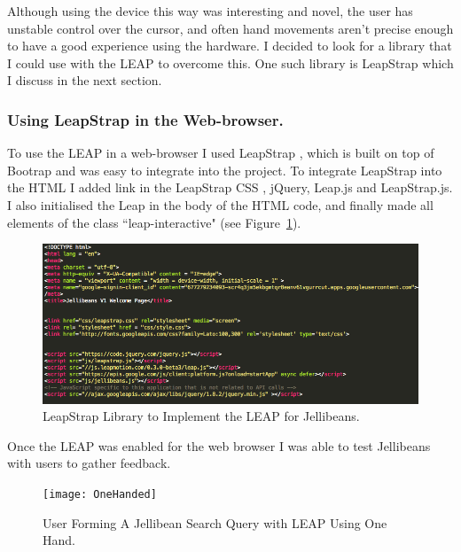 \documentclass[a4paper, 11pt]{article}
\begin{document}
Although using the device this way was interesting and novel, the user has unstable control over the cursor, and often hand movements aren't precise enough to have a good experience using the hardware. I decided to look for a library that I could use with the LEAP to overcome this. One such library is LeapStrap which I discuss in the next section.


\subsubsection{Using LeapStrap in the Web-browser.}
To use the LEAP in a web-browser I used LeapStrap \cite{leapstrap}, which is built on top of Bootrap and was easy to integrate into the project. To integrate LeapStrap into the HTML I added link in the LeapStrap CSS , jQuery, Leap.js and LeapStrap.js. I also initialised the Leap in the body of the HTML code, and finally made all elements of the class ``leap-interactive" (see Figure~\ref{leapstrap}). 

\begin{figure}[H]
\begin{center}
\includegraphics[scale=0.55]{leapstrap}
\caption{LeapStrap Library to Implement the LEAP for Jellibeans.}
\label{leapstrap}
\end{center}
\end{figure}

Once the LEAP was enabled for the web browser I was able to test Jellibeans with users to gather feedback. 

\begin{figure}[H]
\begin{center}
\texttt{[image: OneHanded]}
\caption{User Forming A Jellibean Search Query with LEAP Using One Hand.}
\label{OneHanded}
\end{center}
\end{figure}
\end{document}
